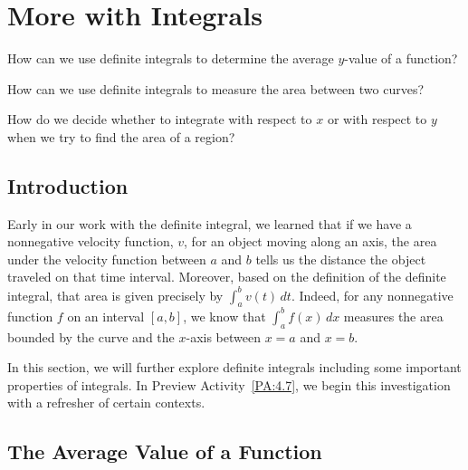 \section{More with Integrals} \label{S:4.7.MoreIntegrals}

\begin{goals}
\item How can we use definite integrals to determine the average $y$-value of a function?
\item How can we use definite integrals to measure the area between two curves?
\item How do we decide whether to integrate with respect to $x$ or with respect to $y$ when we try to find the area of a region?
\end{goals} 

\subsection*{Introduction}

Early in our work with the definite integral, we learned that if we have a nonnegative velocity function, $v$, for an object moving along an axis, the area under the velocity function between $a$ and $b$ tells us the distance the object traveled on that time interval.  Moreover, based on the definition of the definite integral, that area is given precisely by $\int_a^b v(t) \, dt$.  Indeed, for any nonnegative function $f$ on an interval $[a,b]$, we know that $\int_a^b f(x) \, dx$ measures the area bounded by the curve and the $x$-axis between $x = a$ and $x = b$.

In this section, we will further explore definite integrals including some important properties of integrals.  In Preview Activity~\ref{PA:4.7}, we begin this investigation with a refresher of certain contexts. 


\subsection*{The Average Value of a Function}

